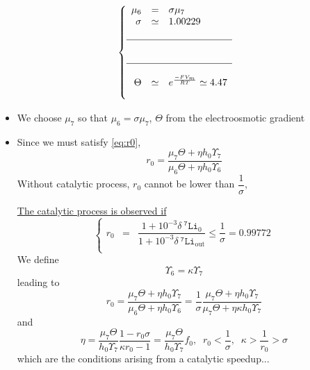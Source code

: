 \documentclass[aps,onecolumn,10pt]{revtex4}
\newcommand{\mychem}[1]{\mathtt{#1}}
\newcommand{\spLi}[1]{{~^{\mychem{#1}}\mychem{Li}}}
\newcommand{\deltaLi}{ {\delta\!\!\!\spLi{7}} }
\newcommand{\deltaLiOut}{{\deltaLi}_{\mathrm{out}}}
\begin{document}
\begin{equation}
\left\lbrace
\begin{array}{rcl}
		\mu_6     & = & \sigma \mu_7\\
		\sigma    & \simeq & 1.00229 \\
		\\
		\hline
		\\
		\\
		\hline
		\\
		\Theta     & \simeq  & e^{\frac{-F V_m}{RT} } \simeq 4.47\\
		\\
\end{array}
\right.
\end{equation}

\begin{itemize}
\item We choose $\mu_7$ so that $\mu_6=\sigma\mu_7$, $\Theta$ from the electroosmotic gradient
\item Since we must satisfy \eqref{eq:r0},
\begin{equation}
	r_0 = \dfrac{\mu_7\Theta+\eta h_0 \Upsilon_7}{\mu_6\Theta+\eta h_0 \Upsilon_6}
\end{equation}
Without catalytic process, $r_0$ cannot be lower than $\dfrac{1}{\sigma}$,

\underline{The catalytic process is observed if}
\begin{equation}
\boxed{
\left\lbrace
\begin{array}{rcl}
	r_0 & = & \dfrac{1+10^{-3}\deltaLi_0}{1+10^{-3}\deltaLiOut} \leq \dfrac{1}{\sigma} = 0.99772\\
\end{array}
\right.
}
\end{equation}
We define
\begin{equation}
	\Upsilon_6  = \kappa \Upsilon_7
\end{equation}
leading to
\begin{equation}
	r_0 =  \dfrac{\mu_7\Theta+\eta h_0 \Upsilon_7}{\mu_6\Theta+\eta h_0 \Upsilon_6} = \dfrac{1}{\sigma} \dfrac{\mu_7\Theta+\eta h_0 \Upsilon_7}{\mu_7\Theta+\eta \kappa h_0 \Upsilon_7}
\end{equation}
and
\begin{equation}
	\boxed{
	\eta = \dfrac{\mu_7\Theta}{h_0\Upsilon_7} \dfrac{1-r_0\sigma}{\kappa r_0-1} = \dfrac{\mu_7\Theta}{h_0\Upsilon_7} f_0
	,\;\; r_0 < \frac{1}{\sigma}, \;\; \kappa > \frac{1}{r_0} > \sigma
	}
\end{equation}
which are the conditions arising from a catalytic speedup...


\end{itemize}
\end{document}
